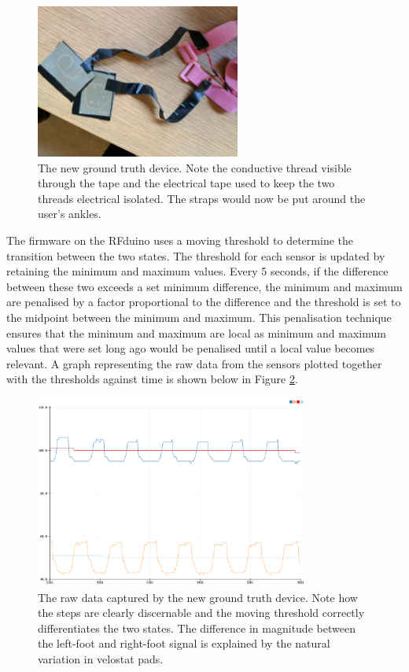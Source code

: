             \begin{figure}[!th]
                \includegraphics[width=0.6\textwidth]{Images/device_new.jpg}
                \centering
                \caption{The new ground truth device. Note the conductive thread visible through the tape and the electrical tape used to keep the two threads electrical isolated. The straps would now be put around the user's ankles.}
                \label{img_device_new}
            \end{figure}

            The firmware on the RFduino uses a moving threshold to determine the transition between the two states. The threshold for each sensor is updated by retaining the minimum and maximum values. Every 5 seconds, if the difference between these two exceeds a set minimum difference, the minimum and maximum are penalised by a factor proportional to the difference and the threshold is set to the midpoint between the minimum and maximum. This penalisation technique ensures that the minimum and maximum are local as minimum and maximum values that were set long ago would be penalised until a local value becomes relevant. A graph representing the raw data from the sensors plotted together with the thresholds against time is shown below in Figure \ref{img_device_new_graph}.

            \begin{figure}[!th]
                \includegraphics[width=0.8\textwidth]{Images/device_new_graph.png}
                \centering
                \caption{The raw data captured by the new ground truth device. Note how the steps are clearly discernable and the moving threshold correctly differentiates the two states. The difference in magnitude between the left-foot and right-foot signal is explained by the natural variation in velostat pads.}
                \label{img_device_new_graph}
            \end{figure}         


